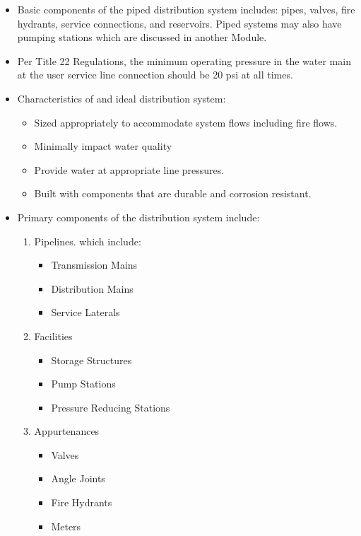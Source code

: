 \begin{itemize}
\item Basic components of the piped distribution system includes: pipes, valves, fire hydrants, service connections, and reservoirs. Piped systems may also have pumping stations which are discussed in another Module. 
\item Per Title 22 Regulations, the minimum operating pressure in the water main at the user service line connection should be 20 psi at all times.
\item Characteristics of and ideal distribution system:
\begin{itemize}
\item Sized appropriately to accommodate system flows including fire flows.
\item Minimally impact water quality
\item Provide water at appropriate line pressures.
\item Built with components that are durable and corrosion resistant.
\end{itemize}
\item Primary components of the distribution system include:

\begin{enumerate}
\item Pipelines. which include:
\begin{itemize}
\item Transmission Mains
\item Distribution Mains
\item Service Laterals
\end{itemize}
\item Facilities
\begin{itemize}
\item Storage Structures
\item Pump Stations
\item Pressure Reducing Stations
\end{itemize}
\item Appurtenances
\begin{itemize}
\item Valves
\item Angle Joints
\item Fire Hydrants
\item Meters
\end{itemize}
\end{enumerate}
\end{itemize}


